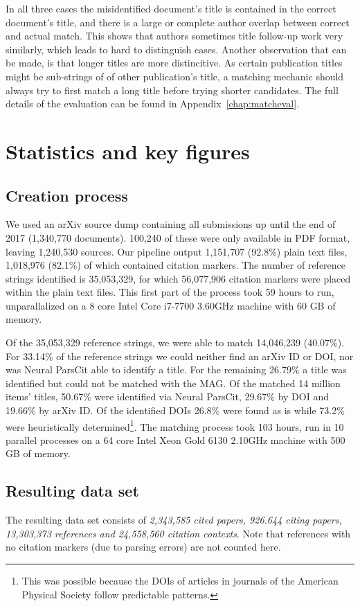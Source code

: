 In all three cases the misidentified document’s title is contained in the correct document’s title, and there is a large or complete author overlap between correct and actual match. This shows that authors sometimes title follow-up work very similarly, which leads to hard to distinguish cases. Another observation that can be made, is that longer titles are more distincitive. As certain publication titles might be sub-strings of of other publication's title, a matching mechanic should always try to first match a long title before trying shorter candidates. The full details of the evaluation can be found in Appendix~\ref{chap:matcheval}.

\section{Statistics and key figures}

\subsection{Creation process}
We used an arXiv source dump containing all submissions up until the end of 2017 (1,340,770 documents). 100,240 of these were only available in PDF format, leaving 1,240,530 sources. Our pipeline output 1,151,707 (92.8\%) plain text files, 1,018,976 (82.1\%) of which contained citation markers. The number of reference strings identified is 35,053,329, for which 56,077,906 citation markers were placed within the plain text files. This first part of the process took 59 hours to run, unparallalized on a 8 core Intel Core i7-7700 3.60GHz machine with 60 GB of memory.

Of the 35,053,329 reference strings, we were able to match 14,046,239 (40.07\%). For 33.14\% of the reference strings we could neither find an arXiv ID or DOI, nor was Neural ParsCit able to identify a title. For the remaining 26.79\% a title was identified but could not be matched with the MAG. Of the matched 14 million items' titles, 50.67\% were identified via Neural ParsCit, 29.67\% by DOI and 19.66\% by arXiv ID. Of the identified DOIs 26.8\% were found as is while 73.2\% were heuristically determined\footnote{This was possible because the DOIs of articles in journals of the American Physical Society follow predictable patterns.}. The matching process took 103 hours, run in 10 parallel processes on a 64 core Intel Xeon Gold 6130 2.10GHz machine with 500 GB of memory.

\subsection{Resulting data set}
The resulting data set consists of \emph{2,343,585 cited papers, 926.644 citing papers, 13,303,373 references and 24,558,560 citation contexts}. Note that references with no citation markers (due to parsing errors) are not counted here.

